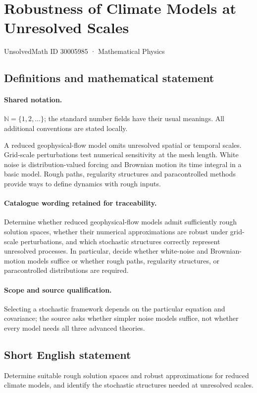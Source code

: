 \documentclass[11pt]{article}
\begin{document}
\setcounter{section}{30005984}
\section{Robustness of Climate Models at Unresolved Scales}\label{30005985}
{\small UnsolvedMath ID 30005985 · Mathematical Physics}
\subsection{Definitions and mathematical statement}

\paragraph{Shared notation.}$\mathbb N=\{1,2,\ldots\}$; the standard number fields have their usual meanings. All additional conventions are stated locally.


A reduced geophysical-flow model omits unresolved spatial or temporal scales. Grid-scale perturbations test numerical sensitivity at the mesh length. White noise is distribution-valued forcing and Brownian motion its time integral in a basic model. Rough paths, regularity structures and paracontrolled methods provide ways to define dynamics with rough inputs.

\paragraph{Catalogue wording retained for traceability.}
Determine whether reduced geophysical-flow models admit sufficiently rough solution spaces, whether their numerical approximations are robust under grid-scale perturbations, and which stochastic structures correctly represent unresolved processes. In particular, decide whether white-noise and Brownian-motion models suffice or whether rough paths, regularity structures, or paracontrolled distributions are required.

\paragraph{Scope and source qualification.}Selecting a stochastic framework depends on the particular equation and covariance; the source asks whether simpler noise models suffice, not whether every model needs all three advanced theories.
\subsection{Short English statement}
Determine suitable rough solution spaces and robust approximations for reduced climate models, and identify the stochastic structures needed at unresolved scales.
\end{document}
